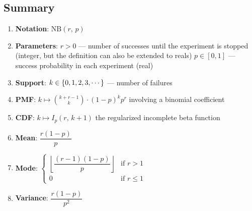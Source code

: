 \subsection{Summary}

\begin{enumerate}
    \item \textbf{Notation}:
    $
         {\displaystyle \mathrm {NB} (r,\,p)}
    $
    \hfill \cite{wiki/Negative_binomial_distribution}

    \item \textbf{Parameters}:
    $r > 0$ — number of successes until the experiment is stopped (integer, but the definition can also be extended to reals) $p \in [0, 1]$ — success probability in each experiment (real)
    \hfill \cite{wiki/Negative_binomial_distribution}

    \item \textbf{Support}:
     $k \in \left\{0, 1, 2, 3, \cdots\right\}$ — number of failures
    \hfill \cite{wiki/Negative_binomial_distribution}

    \item \textbf{PMF}:
    ${\displaystyle k\mapsto {k+r-1 \choose k}\cdot (1-p)^{k}p^{r}}$
    involving a binomial coefficient
    \hfill \cite{wiki/Negative_binomial_distribution}

    \item \textbf{CDF}:
    ${\displaystyle k\mapsto I_{p}(r,\,k+1)}$
    the regularized incomplete beta function
    \hfill \cite{wiki/Negative_binomial_distribution}

    \item \textbf{Mean}:
    $
         {\displaystyle {\dfrac {r(1-p)}{p}}}
    $
    \hfill \cite{wiki/Negative_binomial_distribution}


    \item \textbf{Mode}:
    $
         {\displaystyle {\begin{cases}\left\lfloor {\dfrac {(r-1)(1-p)}{p}}\right\rfloor &{\text{if }}r>1\\0&{\text{if }}r\leq 1\end{cases}}}
    $
    \hfill \cite{wiki/Negative_binomial_distribution}

    \item \textbf{Variance}:
    $
         {\displaystyle {\dfrac {r(1-p)}{p^{2}}}}
    $
    \hfill \cite{wiki/Negative_binomial_distribution}


\end{enumerate}
